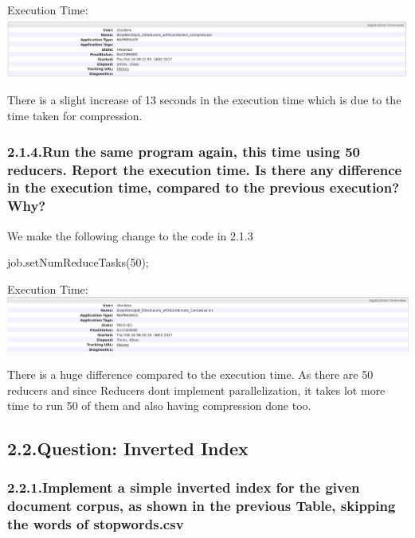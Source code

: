 \documentclass{article}
\begin{document}
Execution Time:
\includegraphics[keepaspectratio=true,width=\dimmin{}{\dimwidth{1.30}}]{images/stopwords4}{}%

\noindent There is a slight increase of 13 seconds in the execution time which is due to the time taken for compression.%

\subsubsection{2.1.4.\hspace*{0.5em}Run the same program again, this time using 50 reducers. Report the execution time. Is there any difference in the execution time, compared to the previous execution? Why?}\label{heading}%

\noindent We make the following change to the code in 2.1.3%
\begin{mdpre}%
\noindent job.setNumReduceTasks({50});%
\end{mdpre}\noindent Execution Time:
\includegraphics[keepaspectratio=true,width=\dimmin{}{\dimwidth{1.30}}]{images/stopwords5}{}

\noindent There is a huge difference compared to the execution time. As there are 50 reducers and since Reducers dont implement parallelization, it takes lot more time to run 50 of them and also having compression done too.%

\subsection{2.2.\hspace*{0.5em}Question: Inverted Index}\label{heading}%

\subsubsection{2.2.1.\hspace*{0.5em}Implement a simple inverted index for the given document corpus, as shown in the previous Table, skipping the words of stopwords.csv}\label{heading}%
\end{document}
